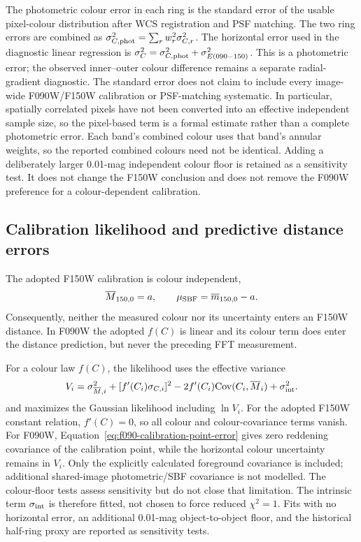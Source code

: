\documentclass[nodoi,nocopyright]{pas}
\newcommand{\mbar}{\overline{m}}
\newcommand{\Mbar}{\overline{M}}
\begin{document}
The photometric colour error in each ring is the standard error of the usable
pixel-colour distribution after WCS registration and PSF matching. The two
ring errors are combined as $\sigma_{C,{\rm phot}}^2=\sum_r
w_r^2\sigma_{C,r}^2$. The horizontal error used in the diagnostic linear regression is
$\sigma_C^2=\sigma_{C,{\rm phot}}^2+\sigma_{E(090-150)}^2$. This is a
photometric error; the observed inner--outer colour difference remains a
separate radial-gradient diagnostic. The standard error does not claim to
include every image-wide F090W/F150W calibration or PSF-matching systematic.
In particular, spatially correlated pixels have not been converted into an
effective independent sample size, so the pixel-based term is a formal
estimate rather than a complete photometric error. Each band's combined
colour uses that band's annular weights, so the reported combined colours need
not be identical. Adding a deliberately larger 0.01-mag independent colour floor is retained as
a sensitivity test. It does not change the F150W conclusion and does not
remove the F090W preference for a colour-dependent calibration.

\subsection{Calibration likelihood and predictive distance errors}

The adopted F150W calibration is colour independent,
\begin{equation}
 \Mbar_{150,0}=a,
 \qquad
 \mu_{\rm SBF}=\mbar_{150,0}-a.
 \label{eq:primary-distance}
\end{equation}
Consequently, neither the measured colour nor its uncertainty enters an F150W
distance. In F090W the adopted $f(C)$ is linear and its colour term does enter
the distance prediction, but never the preceding FFT measurement.

For a colour law $f(C)$, the likelihood uses the effective variance
\begin{equation}
 V_i=\sigma^2_{\Mbar,i}+[f'(C_i)\sigma_{C,i}]^2
 -2f'(C_i){\rm Cov}(C_i,\Mbar_i)+\sigma^2_{\rm int}.
\end{equation}
and maximizes the Gaussian likelihood including $\ln V_i$. For the adopted
F150W constant relation, $f'(C)=0$, so all colour and colour-covariance terms
vanish.  For F090W, Equation~\ref{eq:f090-calibration-point-error} gives zero
reddening covariance of the calibration point, while the horizontal colour
uncertainty remains in $V_i$. Only the explicitly calculated foreground
covariance is included; additional shared-image photometric/SBF covariance
is not modelled. The colour-floor tests assess sensitivity but do not close
that limitation.
The intrinsic term
$\sigma_{\rm int}$ is therefore fitted, not chosen to force reduced
$\chi^2=1$. Fits with no horizontal error, an additional 0.01-mag
object-to-object floor, and the historical half-ring proxy are reported as
sensitivity tests.
\end{document}
